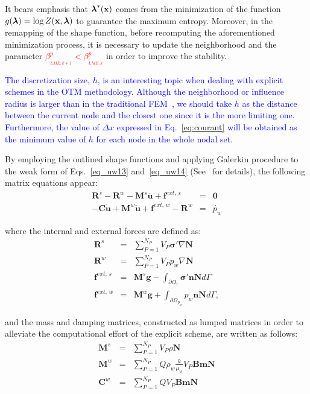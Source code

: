 \documentclass[twocolumn]{svjour3}          %
\begin{document}
It bears emphasis that $\boldsymbol{\lambda}^*(\bf x)$ comes from the minimization of the function $g(\boldsymbol{\lambda})=\log Z(\bf x, \boldsymbol{\lambda})$ to guarantee the maximum entropy. Moreover, in the remapping of the shape function, before recomputing the aforementioned minimization process, it is necessary to update the neighborhood and the parameter \textcolor{red}{$\beta_{_{LME,k+1}}^p < \beta_{_{LME,k}}^p$} in order to improve the stability.

\textcolor{blue}{The discretization size, $h$, is an interesting topic when dealing with explicit schemes in the OTM methodology. Although the neighborhood or influence radius is larger than in the traditional FEM~\cite{li2010}, we should take $h$ as the distance between the current node and the closest one since it is the more limiting one. Furthermore, the value of $\Delta x$ expressed in Eq.~\ref{eq:courant} will be obtained as the minimum value of $h$ for each node in the whole nodal set.}

By employing the outlined shape functions and applying Galerkin procedure to the weak form of Eqs.~\eqref{eq_uw13} and~\eqref{eq_uw14}
 (See~\cite{Sanavia:02,Sanavia:06} for details), the following matrix equations appear:
 \begin{eqnarray}
 \boldsymbol{R}^s- \boldsymbol{R}^w- \boldsymbol{M}^s \ddot{\boldsymbol{u}} + \boldsymbol{f}^{ext, \, s} &=& \boldsymbol{0} \label{mat1}\\
- \boldsymbol{C} \dot{\boldsymbol{u}} + \boldsymbol{M}^w \ddot{\boldsymbol{u}} + \boldsymbol{f}^{ext, \, w}-\boldsymbol{R}^{w}
  \label{mat2} &=& \dot{p_w}
 \end{eqnarray}
 
 where the internal and external forces are defined as:
 \begin{eqnarray}
  \boldsymbol{R}^s &=& \sum_{P=1}^{N_{P}} V_{P} \boldsymbol{\sigma'} \nabla \mathbf{N} \nonumber \\
    \boldsymbol{R}^w &=& \sum_{P=1}^{N_{P}} V_{P} p_w \nabla \mathbf{N} \nonumber \\
  \boldsymbol{f}^{ext, \, s} &=& \boldsymbol{M}^s \boldsymbol{g} - \int_{\partial \Omega_{\tau}} \boldsymbol{\sigma'} \boldsymbol{n}\mathbf{N} d \Gamma\nonumber \\
 \boldsymbol{f}^{ext, \, w} &=& \boldsymbol{M}^w \boldsymbol{g} + \int_{\partial \Omega_{p_w}} p_w \boldsymbol{n} \mathbf{N} d \Gamma, \nonumber
  \end{eqnarray}
  
  and the mass and damping matrices, constructed as lumped matrices in order to alleviate the computational effort of the explicit scheme, are written as follows:
   \begin{eqnarray}
  \boldsymbol{M}^s &=& \sum_{P=1}^{N_{P}} V_{P} \rho \mathbf{N} \nonumber \\
    \boldsymbol{M}^w &=& \sum_{P=1}^{N_{P}} Q \rho_w \frac{k}{\mu_w} V_{P} \mathbf{B}\mathbf{m} \mathbf{N} \nonumber \\
        \boldsymbol{C}^w &=& \sum_{P=1}^{N_{P}} Q V_{P} \mathbf{B}\mathbf{m} \mathbf{N} \nonumber
  \end{eqnarray}
  
\end{document}
